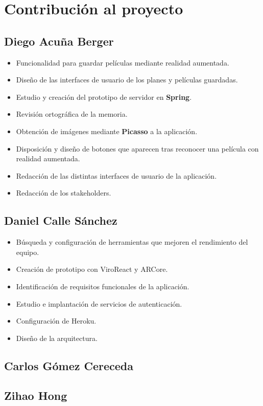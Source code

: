 
\cleardoublepage


\chapter{Contribución al proyecto}
\label{makereference7}

\section{Diego Acuña Berger}
\label{makereference7.1}
\begin{itemize}
    \item Funcionalidad para guardar películas mediante realidad aumentada.
    \item Diseño de las interfaces de usuario de los planes y películas guardadas.  
    \item Estudio y creación del prototipo de servidor en \textbf{Spring}.
    \item Revisión ortográfica de la memoria.
    \item Obtención de imágenes mediante \textbf{Picasso} a la aplicación.
    \item Disposición y diseño de botones que aparecen tras reconocer una película con realidad aumentada.
    \item Redacción de las distintas interfaces de usuario de la aplicación.
    \item Redacción de los stakeholders.
\end{itemize}
\section{Daniel Calle Sánchez}
\label{makereference7.2}
\begin{itemize}  
    \item Búsqueda y configuración de herramientas que mejoren el rendimiento del equipo.
    \item Creación de prototipo con ViroReact y ARCore.
    \item Identificación de requisitos funcionales de la aplicación.
    \item Estudio e implantación de servicios de autenticación.
    \item Configuración de Heroku.
    \item Diseño de la arquitectura.
\end{itemize}

\section{Carlos Gómez Cereceda}
\label{makereference7.3}

\section{Zihao Hong}
\label{makereference7.4}